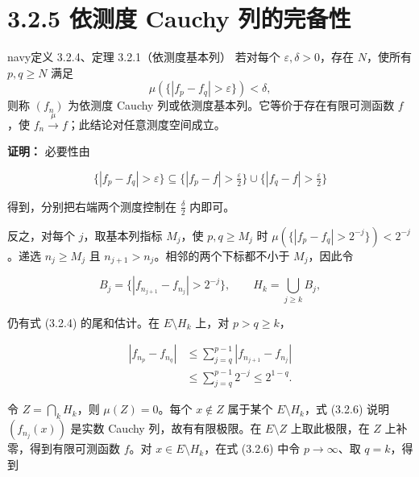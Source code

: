 \documentclass[11pt,a4paper]{article}
\begin{document}
\section[\S{}3.2.5 依测度 Cauchy
列的完备性]{3.2.5 依测度 Cauchy
列的完备性}\label{ux4f9dux6d4bux5ea6-cauchy-ux5217ux7684ux5b8cux5907ux6027}

\begin{sboxenv}{navy}{定义 3.2.4、定理 3.2.1（依测度基本列）}
若对每个 \(\varepsilon,\delta>0\)，存在 \(N\)，使所有 \(p,q\ge N\) 满足
\begin{equation*}\mu(\{|f_p-f_q|>\varepsilon\})<\delta,\end{equation*} 则称 \((f_n)\) 为依测度
Cauchy 列或依测度基本列。它等价于存在有限可测函数 \(f\)，使
\(f_n\xrightarrow{\mu}f\)；此结论对任意测度空间成立。

\end{sboxenv}

\textbf{证明：} 必要性由

\begin{equation*}
\{|f_p-f_q|>\varepsilon\}
\subseteq\{|f_p-f|>\tfrac\varepsilon2\}\cup\{|f_q-f|>\tfrac\varepsilon2\}
\tag{3.2.5}
\end{equation*}

得到，分别把右端两个测度控制在 \(\frac\delta2\) 内即可。

反之，对每个 \(j\)，取基本列指标 \(M_j\)，使 \(p,q\ge M_j\) 时
\(\mu(\{|f_p-f_q|>2^{-j}\})<2^{-j}\)。递选 \(n_j\ge M_j\) 且
\(n_{j+1}>n_j\)。相邻的两个下标都不小于 \(M_j\)，因此令

\begin{equation*}
B_j=\{|f_{n_{j+1}}-f_{n_j}|>2^{-j}\},\qquad
H_k=\bigcup_{j\ge k}B_j,
\end{equation*}

仍有式 (3.2.4) 的尾和估计。在 \(E\setminus H_k\) 上，对 \(p>q\ge k\)，

\begin{equation*}
\begin{aligned}
|f_{n_p}-f_{n_q}|
&\le\sum_{j=q}^{p-1}|f_{n_{j+1}}-f_{n_j}|\\
&\le\sum_{j=q}^{p-1}2^{-j}\le2^{1-q}.
\end{aligned}
\tag{3.2.6}
\end{equation*}

令 \(Z=\bigcap_kH_k\)，则 \(\mu(Z)=0\)。每个 \(x\notin Z\) 属于某个
\(E\setminus H_k\)，式 (3.2.6) 说明 \((f_{n_j}(x))\) 是实数 Cauchy
列，故有有限极限。在 \(E\setminus Z\) 上取此极限，在 \(Z\)
上补零，得到有限可测函数 \(f\)。对 \(x\in E\setminus H_k\)，在式 (3.2.6)
中令 \(p\to\infty\)、取 \(q=k\)，得到
\end{document}
